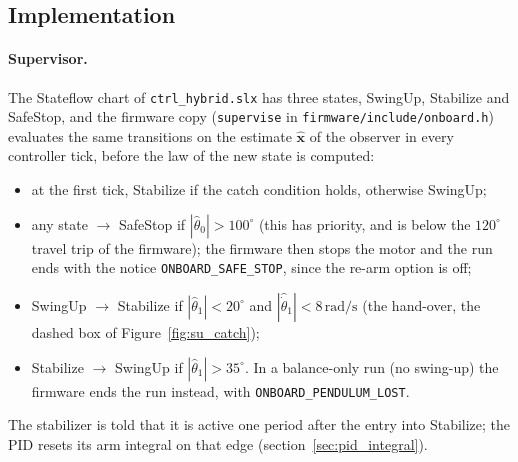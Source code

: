 \documentclass[a4paper,11pt]{article}
\begin{document}
\subsection{Implementation}
\label{sec:su_impl}
\paragraph{Supervisor.} The Stateflow chart of \nolinkurl{ctrl_hybrid.slx} has three states, SwingUp, Stabilize and SafeStop, and the firmware copy (\texttt{supervise} in \nolinkurl{firmware/include/onboard.h}) evaluates the same transitions on the estimate $\hat{\mathbf{x}}$ of the observer in every controller tick, before the law of the new state is computed:
\begin{itemize}
  \item at the first tick, Stabilize if the catch condition holds, otherwise SwingUp;
  \item any state $\rightarrow$ SafeStop if $|\hat\theta_0| > 100^\circ$ (this has priority, and is below the $120^\circ$ travel trip of the firmware); the firmware then stops the motor and the run ends with the notice \texttt{ONBOARD\_SAFE\_STOP}, since the re-arm option is off;
  \item SwingUp $\rightarrow$ Stabilize if $|\hat\theta_1| < 20^\circ$ and $|\hat{\dot\theta}_1| < 8\,\mathrm{rad/s}$ (the hand-over, the dashed box of Figure~\ref{fig:su_catch});
  \item Stabilize $\rightarrow$ SwingUp if $|\hat\theta_1| > 35^\circ$. In a balance-only run (no swing-up) the firmware ends the run instead, with \texttt{ONBOARD\_PENDULUM\_LOST}.
\end{itemize}
The stabilizer is told that it is active one period after the entry into Stabilize; the PID resets its arm integral on that edge (section~\ref{sec:pid_integral}).
\end{document}
